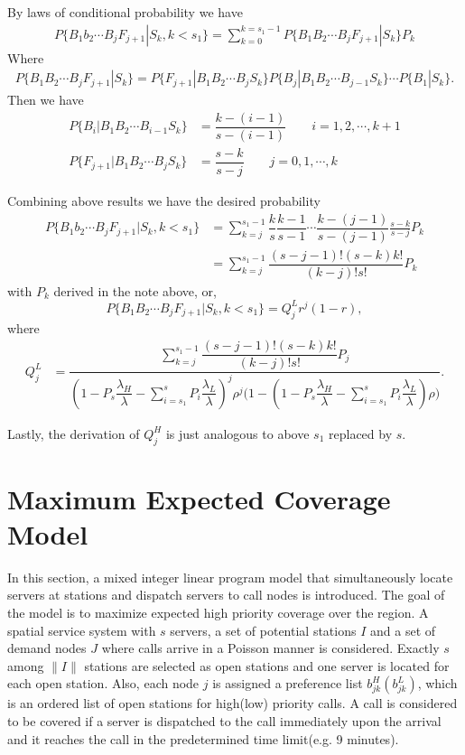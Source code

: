 \documentclass{article}
\begin{document}
By laws of conditional probability we have
\begin{align*}
P \{ B_1b_2 \cdots B_jF_{j+1}|S_k,k<s_1\} = \sum_{k=0}^{k=s_1-1} P \{ B_1B_2 \cdots B_jF_{j+1}|S_k\} P_k
\end{align*}
Where
\begin{align*}
P \{ B_1B_2 \cdots B_jF_{j+1}|S_k\} = P\{F_{j+1}|B_1B_2 \cdots B_j S_k\} P\{B_j|B_1B_2 \cdots B_{j-1}S_k \} \cdots P\{ B_1|S_k\}.
\end{align*}
Then we have
\begin{align*}
P\{B_i|B_1B_2 \cdots B_{i-1}S_k \} &= \dfrac{k-(i-1)}{s-(i-1)} \quad \quad i=1,2, \cdots, k+1 \\
P\{F_{j+1}|B_1B_2 \cdots B_j S_k\} & = \dfrac{s-k}{s-j} \quad \quad  j =0,1,\cdots, k
\end{align*}

Combining above results we have the desired probability
\begin{align*}
P \{ B_1b_2 \cdots B_jF_{j+1}|S_k,k<s_1\} &= \sum_{k=j}^{s_1-1} \dfrac{k}{s} \dfrac{k-1}{s-1}  \cdots \dfrac{k-(j-1)}{s-(j-1)} \frac{s-k}{s-j} P_k\\
 & = \sum_{k=j}^{s_1-1} \dfrac{ (s-j-1)! (s-k) k!}{(k-j)!s!} P_k
\end{align*}
with $P_k$ derived in the note above, or,
\[ P \{ B_1 B_2 \cdots B_j F_{j+1}|S_k,k<s_1\} = Q_j^L r^j (1-r),\]
where
\begin{align*}
 Q_j^L  & = \dfrac{ \sum_{k=j}^{s_1-1} \dfrac{ (s-j-1)! (s-k) k!}{(k-j)!s!} P_j }
      { (1-P_s \dfrac{\lambda_H}{\lambda}-\sum_{i=s_1}^s P_{i} \dfrac{\lambda_L}{\lambda})^j \rho^j  \big( 1-(1-P_s \dfrac{\lambda_H}{\lambda}-\sum_{i=s_1}^s P_{i} \dfrac{\lambda_L}{\lambda})\rho \big) }.
\end{align*}

Lastly, the derivation of $Q_j^H$ is just analogous to above $s_1$ replaced by $s$.





\section{Maximum Expected Coverage Model}
In this section, a mixed integer linear program model that simultaneously locate servers at stations and dispatch servers to call nodes is introduced. The goal of the model is to maximize expected high priority coverage over the region. A spatial service system with $s$ servers, a set of potential stations $I$ and a set of demand nodes $J$ where calls arrive in a Poisson manner is considered. Exactly $s$ among $\|I\|$ stations are selected as open stations and one server is located for each open station. Also, each node $j$ is assigned a preference list $b^H_{jk}(b^L_{jk})$, which is an ordered list of open stations for high(low) priority calls. A call is considered to be covered if a server is dispatched to the call immediately upon the arrival and it reaches the call in the predetermined time limit(e.g. 9 minutes).
\end{document}
